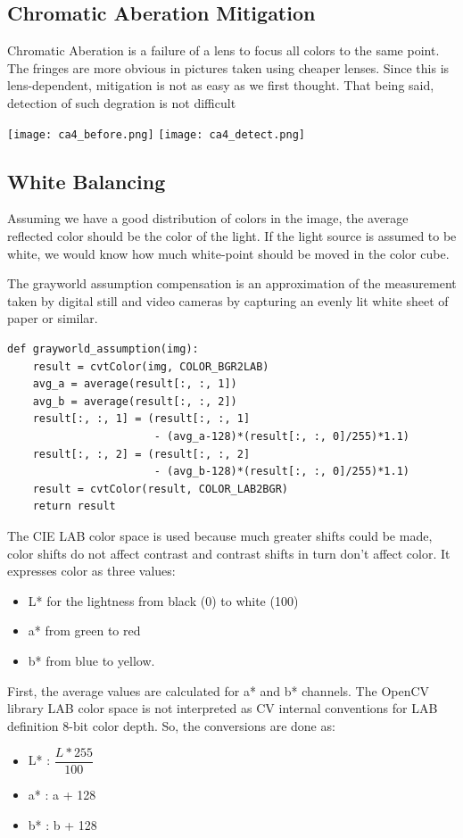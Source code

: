 \documentclass[a4paper,12pt]{article}
\begin{document}
\subsection{Chromatic Aberation Mitigation}
Chromatic Aberation is a failure of a lens to focus all colors to the same point.
The fringes are more obvious in pictures taken using cheaper lenses.
Since this is lens-dependent, mitigation is not as easy as we first thought.
That being said, detection of such degration is not difficult
\begin{center}
  \texttt{[image: ca4\_before.png]}
  \texttt{[image: ca4\_detect.png]}
\end{center}

\subsection{White Balancing}
Assuming we have a good distribution of colors in the image, the average
reflected color should be the color of the light. If the light source is
assumed to be white, we would know how much white-point should be moved in the
color cube.

The grayworld assumption compensation is an approximation of the measurement
taken by digital still and video cameras by capturing an evenly lit white sheet
of paper or similar.
\begin{verbatim}
def grayworld_assumption(img):
    result = cvtColor(img, COLOR_BGR2LAB)
    avg_a = average(result[:, :, 1])
    avg_b = average(result[:, :, 2])
    result[:, :, 1] = (result[:, :, 1]
                       - (avg_a-128)*(result[:, :, 0]/255)*1.1)
    result[:, :, 2] = (result[:, :, 2]
                       - (avg_b-128)*(result[:, :, 0]/255)*1.1)
    result = cvtColor(result, COLOR_LAB2BGR)
    return result
\end{verbatim}

The CIE LAB color space is used because much greater shifts could be made,
color shifts do not affect contrast and contrast shifts in turn don't affect
color. It expresses color as three values:
\begin{itemize}
  \item L* for the lightness from black (0) to white (100)
  \item a* from green to red
  \item b* from blue to yellow.
\end{itemize}

First, the average values are calculated for a* and b* channels. The OpenCV
library LAB color space is not interpreted as CV internal conventions for LAB
definition 8-bit color depth. So, the conversions are done as:
\begin{itemize}
  \item L* : $\dfrac{L * 255}{100}$
  \item a* : a + 128
  \item b* : b + 128
\end{itemize}
\end{document}
